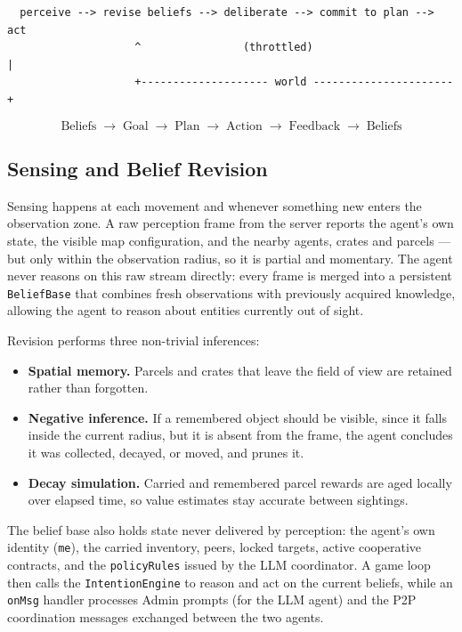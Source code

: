 \documentclass[a4paper,11pt]{article}
\begin{document}
\begin{center}
\begin{verbatim}
  perceive --> revise beliefs --> deliberate --> commit to plan --> act
                    ^                (throttled)                       |
                    +-------------------- world ---------------------- +
\end{verbatim}
\end{center}

\[
\text{Beliefs} \;\rightarrow\; \text{Goal} \;\rightarrow\; \text{Plan}
\;\rightarrow\; \text{Action} \;\rightarrow\; \text{Feedback}
\;\rightarrow\; \text{Beliefs}
\]

\subsection{Sensing and Belief Revision}

Sensing happens at each movement and whenever something new enters the observation
zone. A raw perception frame from the server reports the agent's own state, the
visible map configuration, and the nearby agents, crates and parcels --- but only
within the observation radius, so it is partial and momentary. The agent never
reasons on this raw stream directly: every frame is merged into a persistent
\texttt{BeliefBase} that combines fresh observations with previously acquired
knowledge, allowing the agent to reason about entities currently out of sight.

Revision performs three non-trivial inferences:

\begin{itemize}
  \item \textbf{Spatial memory.} Parcels and crates that leave the field of view
        are retained rather than forgotten.
  \item \textbf{Negative inference.} If a remembered object should be visible, since it falls inside 
        the current radius, but it is absent from the frame, the agent
        concludes it was collected, decayed, or moved, and prunes it.
  \item \textbf{Decay simulation.} Carried and remembered parcel rewards are aged
        locally over elapsed time, so value estimates stay accurate between
        sightings.
\end{itemize}

The belief base also holds state never delivered by perception: the agent's own
identity (\texttt{me}), the carried inventory, peers, locked targets, active
cooperative contracts, and the \texttt{policyRules} issued by the LLM coordinator.
A game loop then calls the \texttt{IntentionEngine} to reason and act on the current
beliefs, while an \texttt{onMsg} handler processes Admin prompts (for the LLM agent)
and the P2P coordination messages exchanged between the two agents.
\end{document}
